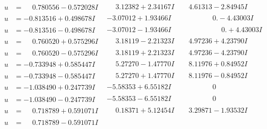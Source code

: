 \documentclass[1p]{elsarticle_modified}
\theoremstyle{definition}
\begin{document}
$$\begin{array}{c|c|c}
\begin{aligned}
u &= \phantom{-}0.780556 - 0.572028 I\end{aligned}
 & \phantom{-}3.12382 + 2.34167 I & \phantom{-}4.61313 - 2.84945 I \\ \hline\begin{aligned}
u &= -0.813516 + 0.498678 I\end{aligned}
 & -3.07012 + 1.93466 I & \phantom{-0.000000 } 0. - 4.43003 I \\ \hline\begin{aligned}
u &= -0.813516 - 0.498678 I\end{aligned}
 & -3.07012 - 1.93466 I & \phantom{-0.000000 -}0. + 4.43003 I \\ \hline\begin{aligned}
u &= \phantom{-}0.760520 + 0.575296 I\end{aligned}
 & \phantom{-}3.18119 - 2.21323 I & \phantom{-}4.97236 + 4.23790 I \\ \hline\begin{aligned}
u &= \phantom{-}0.760520 - 0.575296 I\end{aligned}
 & \phantom{-}3.18119 + 2.21323 I & \phantom{-}4.97236 - 4.23790 I \\ \hline\begin{aligned}
u &= -0.733948 + 0.585447 I\end{aligned}
 & \phantom{-}5.27270 - 1.47770 I & \phantom{-}8.11976 + 0.84952 I \\ \hline\begin{aligned}
u &= -0.733948 - 0.585447 I\end{aligned}
 & \phantom{-}5.27270 + 1.47770 I & \phantom{-}8.11976 - 0.84952 I \\ \hline\begin{aligned}
u &= -1.038490 + 0.247739 I\end{aligned}
 & -5.58353 + 6.55182 I & \phantom{-0.000000 } 0 \\ \hline\begin{aligned}
u &= -1.038490 - 0.247739 I\end{aligned}
 & -5.58353 - 6.55182 I & \phantom{-0.000000 } 0 \\ \hline\begin{aligned}
u &= \phantom{-}0.718789 + 0.591071 I\end{aligned}
 & \phantom{-}0.18371 + 5.12454 I & \phantom{-}3.29871 - 1.93532 I \\ \hline\begin{aligned}
u &= \phantom{-}0.718789 - 0.591071 I\end{aligned}

\end{array}$$
\end{document}
